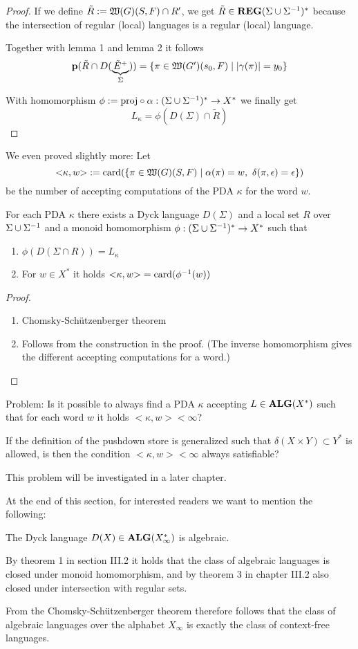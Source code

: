 \begin{proof}
If we define $\tilde{R} := \mbox{$\mathfrak{W}({G})$}(S, F) \cap R'$, we get $\tilde{R} \in
\mbox{{\bf REG}}(\Sigma \cup {\Sigma}^{-1})^*$ because the intersection of regular (local)
languages is a regular (local) language.

Together with lemma 1 and lemma 2 it follows
\[ \mathbf{p}({\tilde{R} \cap D(\underbrace{\tilde{E}^+}_{\Sigma})}) = \mbox{$\{\pi \in
\mbox{$\mathfrak{W}({G'})$}(s_0, F) \mid |\gamma(\pi)| = y_0\}$} \]

With homomorphism $\phi := \mathrm{proj} \circ \alpha : (\Sigma \cup {\Sigma}^{-1})^*
\to X^*$ we finally get
\[ L_\kappa = \phi(D(\Sigma) \cap \tilde{R}) \]
\end{proof}

We even proved slightly more: Let 
\[ {<}\kappa, w{>} := \mathrm{card}({\mbox{$\{\pi \in
\mbox{$\mathfrak{W}({G})$}(S,F) \mid \alpha(\pi) = w,\ \delta(\pi, \epsilon) = \epsilon\}$}})
\]
be the number of accepting computations of the PDA $\kappa$ for the word $w$.

\begin{corollary}
For each PDA $\kappa$ there exists a Dyck language $D(\Sigma)$ and a local set
$R$ over $\Sigma \cup {\Sigma}^{-1}$ and a monoid homomorphism $\phi:
(\Sigma \cup {\Sigma}^{-1})^* \to X^*$ such that
\begin{enumerate}
  \item $\phi(D(\Sigma\cap R)) = L_\kappa$
  \item For $w\in X^*$ it holds ${<}\kappa, w{>} = \mathrm{card}({\phi^{-1}(w)})$
\end{enumerate}
\end{corollary}

\begin{proof}\ 

\begin{enumerate}
  \item Chomsky-Schützenberger theorem
  \item Follows from the construction in the proof. (The inverse homomorphism
  gives the different accepting computations for a word.)
\end{enumerate}
\end{proof}

Problem: Is it possible to always find a PDA $\kappa$ accepting 
$L \in \mbox{{\bf ALG}}(X^*)$ such that for each word $w$ it holds 
${<}\kappa, w{>} < \infty$?

If the definition of the pushdown store is generalized such that $\delta(X
\times Y) \subset Y^*$ is allowed, is then the condition ${<}\kappa, w{>} <
\infty$ always satisfiable?

This problem will be investigated in a later chapter.

\medskip
At the end of this section, for interested readers we want to mention the
following:

The Dyck language $D(X) \in \mbox{{\bf ALG}}(X_\infty^*)$ is algebraic.

By theorem 1 in section III.2 it holds that the class of algebraic languages is
closed under monoid homomorphism, and by theorem 3 in chapter III.2 also closed
under intersection with regular sets.

From the Chomsky-Schützenberger theorem therefore follows that the class of
algebraic languages over the alphabet $X_\infty$ is exactly the class of
context-free languages.

